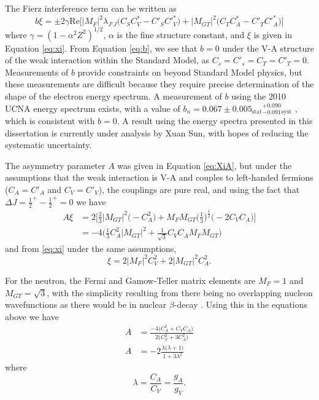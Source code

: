 The Fierz interference term can be written as
\begin{equation}
  b\xi = \pm 2\gamma \mathrm{Re}\bigg[|M_{F}|^2 \lambda_{J'J}\big(C_SC^*_V-C'_SC'^*_V \big) 
    + |M_{GT}|^2\big(C_TC^*_A-C'_TC'^*_A \big) \bigg]
  \label{eq:b}
\end{equation}
where $\gamma = (1-\alpha ^2 Z^2)^{1/2}$, $\alpha$ is the fine structure constant, and $\xi$ is given in
Equation \ref{eq:xi}. From Equation \ref{eq:b}, we see that $b=0$ under the V-A structure
of the weak interaction within the Standard Model, as
$C_s = C'_s = C_T = C'_T = 0$. Measurements of $b$ provide constraints on
beyond Standard Model physics, but these measurements are difficult because they
require precise determination of the shape of the electron energy spectrum. A measurement of
$b$ using the 2010 UCNA energy spectrum exists, with a value of
$b_n = 0.067 \pm 0.005_{\mathrm{stat}}{}^{+ 0.090}_{-0.091}{}_{\mathrm{syst}}$ \cite{hickerson2017}, which is consistent with
$b=0$. A result using the energy
spectra presented in this dissertation is currently under analysis by Xuan Sun, with hopes of reducing the
systematic uncertainty.

The asymmetry parameter $A$ was given in Equation \ref{eq:XiA}, but under the assumptions that the
weak interaction is V-A and couples to left-handed fermions ($C_A=C'_A$ and $C_V=C'_V$), the couplings
are pure real, and using the fact that
$\Delta J = {\frac{1}{2}}^+ - {\frac{1}{2}}^+ = 0$ we have
%
\begin{align}
  A\xi &= 2\bigg[ \frac{2}{3} |M_{GT}|^2 \Big(-C_A^2\Big) 
    + M_FM_{GT}\Big(\frac{1}{3}\Big)^{\frac{1}{2}}\big(-2C_VC_A \big) \bigg] \\
  &=-4 \bigg( \frac{1}{3}C_A^2|M_{GT}|^2 + \frac{1}{\sqrt{3}} C_VC_A M_FM_{GT} \bigg)
  \label{eq:XiAsimple}
\end{align}
%
and from \ref{eq:xi} under the same assumptions,
%
\begin{equation}
  \xi = 2|M_F|^2C_V^2+2|M_{GT}|^2C_A^2.
\end{equation}
%

For the neutron, the Fermi and Gamow-Teller matrix elements are $M_F=1$ and
$M_{GT} = \sqrt{3}$, with the simplicity resulting from there being no
overlapping nucleon wavefunctions as there would be in nuclear $\beta$-decay
\cite{grotz1990}. Using this in the equations above we have
%
\begin{align}
  A & =\frac{-4 \big( C_A^2 +  C_VC_A \big)}{2 \big(C_V^2 + 3C_A^2\big)} \\
  A & = -2 \frac{ \lambda \big(\lambda+1\big)}{ 1 + 3\lambda^2}
\end{align}
%
where
%
\begin{equation}
  \lambda = \frac{C_A}{C_V} = \frac{g_A}{g_V}.
\end{equation}


